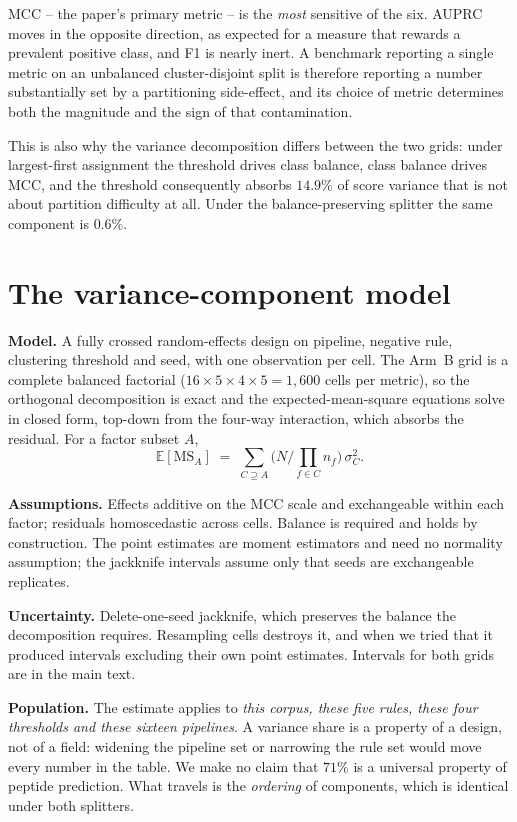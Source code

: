 \documentclass[11pt,a4paper]{article}
\begin{document}
\noindent MCC -- the paper's primary metric -- is the \emph{most} sensitive of the six.
AUPRC moves in the opposite direction, as expected for a measure that rewards a prevalent
positive class, and F1 is nearly inert. A benchmark reporting a single metric on an
unbalanced cluster-disjoint split is therefore reporting a number substantially set by a
partitioning side-effect, and its choice of metric determines both the magnitude and the
sign of that contamination.

This is also why the variance decomposition differs between the two grids: under
largest-first assignment the threshold drives class balance, class balance drives MCC, and
the threshold consequently absorbs $14.9\%$ of score variance that is not about partition
difficulty at all. Under the balance-preserving splitter the same component is $0.6\%$.

\section{The variance-component model}
\label{sec:varmodel}

\textbf{Model.} A fully crossed random-effects design on pipeline, negative rule, clustering
threshold and seed, with one observation per cell. The Arm~B grid is a complete balanced
factorial ($16 \times 5 \times 4 \times 5 = 1{,}600$ cells per metric), so the orthogonal
decomposition is exact and the expected-mean-square equations solve in closed form,
top-down from the four-way interaction, which absorbs the residual. For a factor subset $A$,
\[
\mathbb{E}[\mathrm{MS}_A] \;=\;
\sum_{C \supseteq A} \Big( N \big/ \textstyle\prod_{f \in C} n_f \Big)\, \sigma^2_C .
\]

\textbf{Assumptions.} Effects additive on the MCC scale and exchangeable within each factor;
residuals homoscedastic across cells. Balance is required and holds by construction. The
point estimates are moment estimators and need no normality assumption; the jackknife
intervals assume only that seeds are exchangeable replicates.

\textbf{Uncertainty.} Delete-one-seed jackknife, which preserves the balance the
decomposition requires. Resampling cells destroys it, and when we tried that it produced
intervals excluding their own point estimates. Intervals for both grids are in the main
text.

\textbf{Population.} The estimate applies to \emph{this corpus, these five rules, these four
thresholds and these sixteen pipelines}. A variance share is a property of a design, not of
a field: widening the pipeline set or narrowing the rule set would move every number in the
table. We make no claim that $71\%$ is a universal property of peptide prediction. What
travels is the \emph{ordering} of components, which is identical under both splitters.
\end{document}

